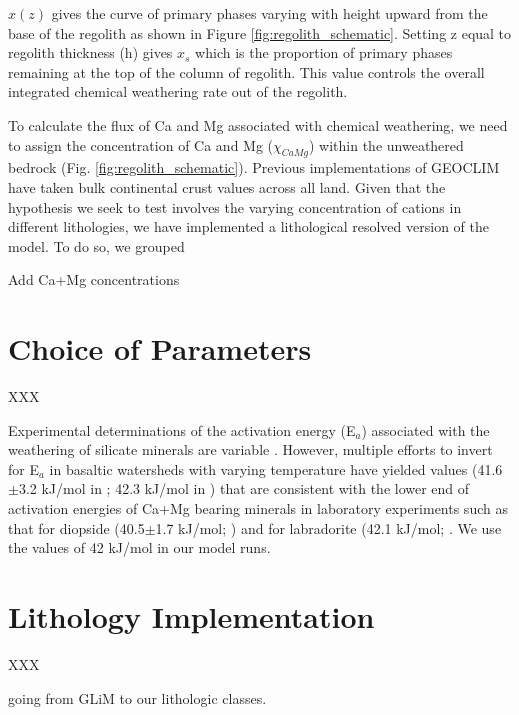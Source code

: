 \documentclass[11pt,letterpaper]{article}
\begin{document}
\noindent $x(z)$ gives the curve of primary phases varying with height upward from the base of the regolith as shown in Figure \ref{fig:regolith_schematic}. Setting z equal to regolith thickness (h) gives $x_s$ which is the proportion of primary phases remaining at the top of the column of regolith. This value controls the overall integrated chemical weathering rate out of the regolith.

To calculate the flux of Ca and Mg associated with chemical weathering, we need to assign the concentration of Ca and Mg ($\chi_{CaMg}$) within the unweathered bedrock (Fig. \ref{fig:regolith_schematic}). Previous implementations of GEOCLIM have taken bulk continental crust values across all land. Given that the hypothesis we seek to test involves the varying concentration of cations in different lithologies, we have implemented a lithological resolved version of the model. To do so, we grouped 

Add Ca+Mg concentrations

\section*{Choice of Parameters}

XXX

Experimental determinations of the activation energy (E$_a$) associated with the weathering of silicate minerals are variable \citep{Brantley2003a}. However, multiple efforts to invert for E$_a$ in basaltic watersheds with varying temperature have yielded values (41.6$\pm$3.2 kJ/mol in \citealp{Li2016a}; 42.3 kJ/mol in \citealp{Dessert2001a}) that are consistent with the lower end of activation energies of Ca+Mg bearing minerals in laboratory experiments such as that for diopside (40.5$\pm$1.7 kJ/mol; \citealp{Knauss1993a}) and for labradorite (42.1 kJ/mol; \citealp{Carroll2005a}. We use the values of 42 kJ/mol in our model runs.

\section*{Lithology Implementation}

XXX

going from GLiM to our lithologic classes.

\clearpage

\singlespacing

\newpage



\end{document}
